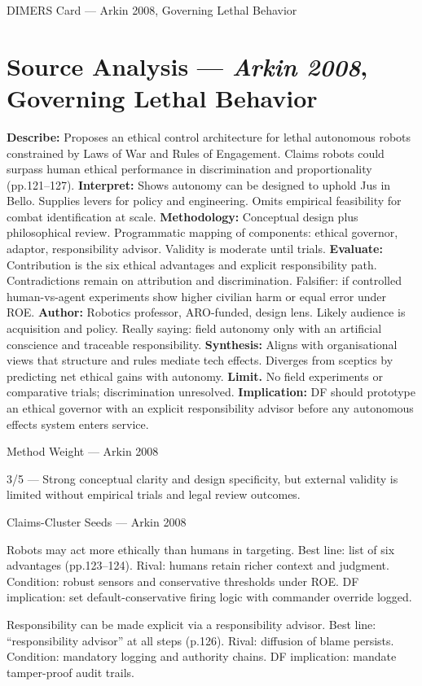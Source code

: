 \parencite{ARKIN_2008} DIMERS Card — Arkin 2008, Governing Lethal Behavior

\section*{Source Analysis — \textit{Arkin 2008}, Governing Lethal Behavior}
\textbf{Describe:} Proposes an ethical control architecture for lethal autonomous robots constrained by Laws of War and Rules of Engagement. Claims robots could surpass human ethical performance in discrimination and proportionality (pp.121–127).
\textbf{Interpret:} Shows autonomy can be designed to uphold Jus in Bello. Supplies levers for policy and engineering. Omits empirical feasibility for combat identification at scale.
\textbf{Methodology:} Conceptual design plus philosophical review. Programmatic mapping of components: ethical governor, adaptor, responsibility advisor. Validity is moderate until trials.
\textbf{Evaluate:} Contribution is the six ethical advantages and explicit responsibility path. Contradictions remain on attribution and discrimination. Falsifier: if controlled human-vs-agent experiments show higher civilian harm or equal error under ROE.
\textbf{Author:} Robotics professor, ARO-funded, design lens. Likely audience is acquisition and policy. Really saying: field autonomy only with an artificial conscience and traceable responsibility.
\textbf{Synthesis:} Aligns with organisational views that structure and rules mediate tech effects. Diverges from sceptics by predicting net ethical gains with autonomy.
\textbf{Limit.} No field experiments or comparative trials; discrimination unresolved. \textbf{Implication:} DF should prototype an ethical governor with an explicit responsibility advisor before any autonomous effects system enters service.

Method Weight — Arkin 2008

3/5 — Strong conceptual clarity and design specificity, but external validity is limited without empirical trials and legal review outcomes.

Claims-Cluster Seeds — Arkin 2008

Robots may act more ethically than humans in targeting. Best line: list of six advantages (pp.123–124). Rival: humans retain richer context and judgment. Condition: robust sensors and conservative thresholds under ROE. DF implication: set default-conservative firing logic with commander override logged.

Responsibility can be made explicit via a responsibility advisor. Best line: “responsibility advisor” at all steps (p.126). Rival: diffusion of blame persists. Condition: mandatory logging and authority chains. DF implication: mandate tamper-proof audit trails.

